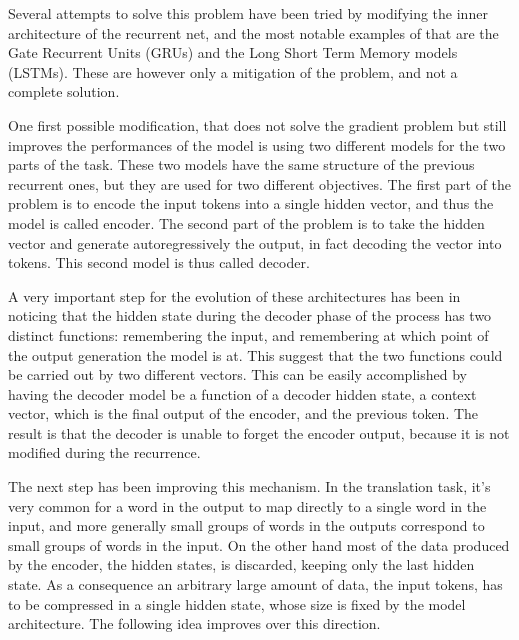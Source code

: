 \documentclass[]{marticle}
\begin{document}
Several attempts to solve this problem have been tried by modifying the inner architecture of the
recurrent net, and the most notable examples of that are the Gate Recurrent Units (GRUs) and the
Long Short Term Memory models (LSTMs). These are however only a mitigation of the problem, and not a
complete solution.

One first possible modification, that does not solve the gradient problem but still improves the
performances of the model is using two different models for the two parts of the task. These two
models have the same structure of the previous recurrent ones, but they are used for two different
objectives. The first part of the problem is to encode the input tokens into a single hidden vector,
and thus the model is called encoder. The second part of the problem is to take the hidden vector
and generate autoregressively the output, in fact decoding the vector into tokens. This second model
is thus called decoder.

A very important step for the evolution of these architectures has been in noticing that the hidden
state during the decoder phase of the process has two distinct functions: remembering the input, and
remembering at which point of the output generation the model is at. This suggest that the two
functions could be carried out by two different vectors. This can be easily accomplished by having
the decoder model be a function of a decoder hidden state, a context vector, which is the final
output of the encoder, and the previous token. The result is that the decoder is unable to forget
the encoder output, because it is not modified during the recurrence.

The next step has been improving this mechanism. In the translation task, it's very common for a
word in the output to map directly to a single word in the input, and more generally small groups of
words in the outputs correspond to small groups of words in the input. On the other hand most of the
data produced by the encoder, the hidden states, is discarded, keeping only the last hidden state.
As a consequence an arbitrary large amount of data, the input tokens, has to be compressed in a
single hidden state, whose size is fixed by the model architecture. The following idea improves over
this direction.
\end{document}
